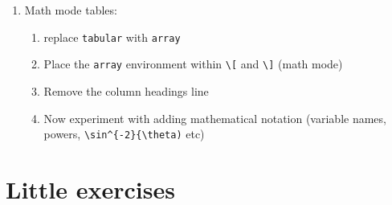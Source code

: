 \documentclass[a4paper]{article}
\begin{document}
\begin{enumerate}
\begin{enumerate}
	    \parbox[t][1.2\totalheight]{2cm}{This is a very long column name indeed}
	    \item Place the whole table landscape on a page by itself. Place \verb=\usepackage{lscape}= in the preamble, then \verb=\begin{landscape} ... \end{landscape}= around the table.
	\end{enumerate}
  \item Math mode tables: 
  \begin{enumerate}
  \item replace \verb=tabular= with \verb=array=
  \item Place the \verb=array= environment within \verb=\[= and \verb=\]= (math mode)
  \item Remove the column headings line
  \item Now experiment with adding mathematical notation (variable names, powers, \verb=\sin^{-2}{\theta)= etc)
  \end{enumerate}
\end{enumerate}

\section{Little exercises}
\end{document}
